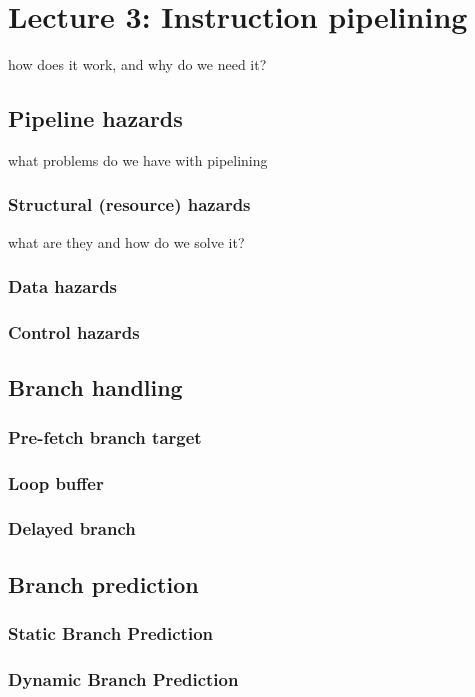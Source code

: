 \documentclass[titlepage, a4paper]{article}
\begin{document}
\section{Lecture 3: Instruction pipelining}
how does it work, and why do we need it?

\subsection{Pipeline hazards}
what problems do we have with pipelining

\subsubsection{Structural (resource) hazards}
what are they and how do we solve it?

\subsubsection{Data hazards}

\subsubsection{Control hazards}

\subsection{Branch handling}
\subsubsection{Pre-fetch branch target}
\subsubsection{Loop buffer}
\subsubsection{Delayed branch}

\subsection{Branch prediction}
\subsubsection{Static Branch Prediction}
\subsubsection{Dynamic Branch Prediction}
\end{document}
